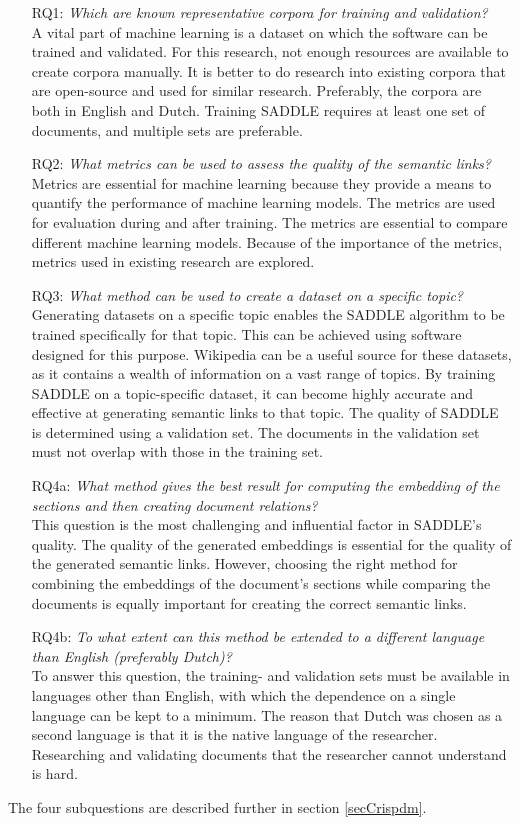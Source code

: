 \begin{itemize}
  \item[RQ1:] \textit{Which are known representative corpora for training and validation?}\\
A vital part of machine learning is a dataset on which the software can be trained and validated. For this research, not enough resources are available to create corpora manually. It is better to do research into existing corpora that are open-source and used for similar research. Preferably, the corpora are both in English and Dutch. Training SADDLE requires at least one set of documents, and multiple sets are preferable. 
  \item[RQ2:] \textit{What metrics can be used to assess the quality of the semantic links?}\\
Metrics are essential for machine learning because they provide a means to quantify the performance of machine learning models. The metrics are used for evaluation during and after training. The metrics are essential to compare different machine learning models. Because of the importance of the metrics, metrics used in existing research are explored.
  \item[RQ3:] \textit{What method can be used to create a dataset on a specific topic?}\\
    Generating datasets on a specific topic enables the SADDLE algorithm to be trained specifically for that topic. This can be achieved using software designed for this purpose. Wikipedia can be a useful source for these datasets, as it contains a wealth of information on a vast range of topics. By training SADDLE on a topic-specific dataset, it can become highly accurate and effective at generating semantic links to that topic. 
The quality of SADDLE is determined using a validation set. The documents in the validation set must not overlap with those in the training set. 
  \item[RQ4a:] \textit{What method gives the best result for computing the embedding of the sections and then creating document relations?}\\
  This question is the most challenging and influential factor in SADDLE's quality. The quality of the generated embeddings is essential for the quality of the generated semantic links. However, choosing the right method for combining the embeddings of the document's sections while comparing the documents is equally important for creating the correct semantic links.  
  \item[RQ4b:] \textit{To what extent can this method be extended to a different language than English (preferably Dutch)?}\\
  To answer this question, the training- and validation sets must be available in languages other than English, with which the dependence on a single language can be kept to a minimum. The reason that Dutch was chosen as a second language is that it is the native language of the researcher. Researching and validating documents that the researcher cannot understand is hard.
  \end{itemize}
The four subquestions are described further in section \ref{secCrispdm}.
\pagebreak

